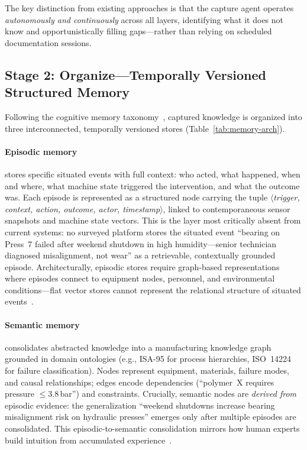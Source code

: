 \documentclass[]{ceurart}
\begin{document}
The key distinction from existing approaches is that the capture agent
operates \emph{autonomously and continuously} across all layers,
identifying what it does not know and opportunistically filling
gaps---rather than relying on scheduled documentation sessions.

\subsection{Stage 2: Organize---Temporally Versioned Structured
  Memory}\label{sec:organize}

Following the cognitive memory taxonomy~\cite{sumers2024coala}, captured
knowledge is organized into three interconnected, temporally versioned
stores (Table~\ref{tab:memory-arch}).

\paragraph{Episodic memory} stores specific situated events with full
context: who acted, what happened, when and where, what machine state
triggered the intervention, and what the outcome was. Each episode is
represented as a structured node carrying the tuple
$\langle$\textit{trigger, context, action, outcome, actor,
timestamp}$\rangle$, linked to contemporaneous sensor snapshots and
machine state vectors. This is the layer most critically absent from
current systems: no surveyed platform stores the situated event ``bearing
on Press~7 failed after weekend shutdown in high humidity---senior
technician diagnosed misalignment, not wear'' as a retrievable,
contextually grounded episode. Architecturally, episodic stores require
graph-based representations where episodes connect to equipment nodes,
personnel, and environmental conditions---flat vector stores cannot
represent the relational structure of situated
events~\cite{graphmemsurvey2026}.

\paragraph{Semantic memory} consolidates abstracted knowledge into a
manufacturing knowledge graph grounded in domain ontologies (e.g.,
ISA-95 for process hierarchies, ISO~14224 for failure
classification). Nodes represent equipment, materials, failure modes, and
causal relationships; edges encode dependencies (``polymer~X requires
pressure $\leq$3.8\,bar'') and constraints. Crucially, semantic
nodes are \emph{derived from} episodic evidence: the generalization
``weekend shutdowns increase bearing misalignment risk on hydraulic
presses'' emerges only after multiple episodes are consolidated.
This episodic-to-semantic consolidation mirrors how human experts build
intuition from accumulated experience~\cite{gam2026}.
\end{document}
